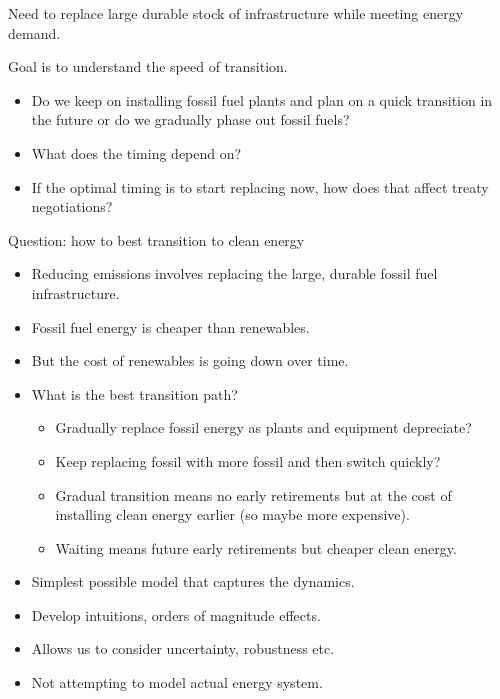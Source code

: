 \documentclass[singlespace]{easychithesis}
\begin{document}
Need to replace large durable stock of infrastructure while meeting energy demand.

Goal is to understand the speed of transition.

\begin{itemize}
	\item{Do we keep on installing fossil fuel plants and plan on a quick transition in the future or do we gradually phase out fossil fuels?}
	\item{What does the timing depend on?}
	\item{If the optimal timing is to start replacing now, how does that affect treaty negotiations?}
\end{itemize}



Question: how to best transition to clean energy

\begin{itemize}
\item Reducing emissions involves replacing the large, durable fossil fuel
infrastructure.
\item Fossil fuel energy is cheaper than renewables.
\item But the cost of renewables is going down over time.
\item What is the best transition path?


\begin{itemize}
\item Gradually replace fossil energy as plants and equipment depreciate?
\item Keep replacing fossil with more fossil and then switch quickly?
\item Gradual transition means no early retirements but at the cost of
installing clean energy earlier (so maybe more expensive).
\item Waiting means future early retirements but cheaper clean energy.
\end{itemize}
\end{itemize}




\begin{itemize}
\item Simplest possible model that captures the dynamics.

\item Develop intuitions, orders of magnitude effects.

\item Allows us to consider uncertainty, robustness etc.

\item Not attempting to model actual energy system.
\end{itemize}
\end{document}

